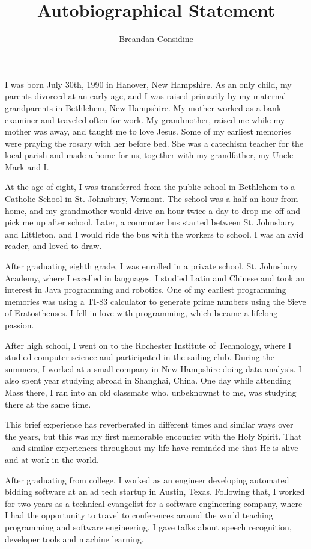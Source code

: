 \documentclass[11pt]{article}
\title{Autobiographical Statement}
\author{Breandan Considine}
\begin{document}
\maketitle
I was born July 30th, 1990 in Hanover, New Hampshire. As an only child, my parents divorced at an early age, and I was raised primarily by my maternal grandparents in Bethlehem, New Hampshire. My mother worked as a bank examiner and traveled often for work. My grandmother, raised me while my mother was away, and taught me to love Jesus. Some of my earliest memories were praying the rosary with her before bed. She was a catechism teacher for the local parish and made a home for us, together with my grandfather, my Uncle Mark and I.

At the age of eight, I was transferred from the public school in Bethlehem to a Catholic School in St. Johnsbury, Vermont. The school was a half an hour from home, and my grandmother would drive an hour twice a day to drop me off and pick me up after school. Later, a commuter bus started between St. Johnsbury and Littleton, and I would ride the bus with the workers to school. I was an avid reader, and loved to draw.

After graduating eighth grade, I was enrolled in a private school, St. Johnsbury Academy, where I excelled in languages. I studied Latin and Chinese and took an interest in Java programming and robotics. One of my earliest programming memories was using a TI-83 calculator to generate prime numbers using the Sieve of Eratosthenses. I fell in love with programming, which became a lifelong passion.

After high school, I went on to the Rochester Institute of Technology, where I studied computer science and participated in the sailing club. During the summers, I worked at a small company in New Hampshire doing data analysis. I also spent year studying abroad in Shanghai, China. One day while attending Mass there, I ran into an old classmate who, unbeknownst to me, was studying there at the same time.

This brief experience has reverberated in different times and similar ways over the years, but this was my first memorable encounter with the Holy Spirit. That -- and similar experiences throughout my life have reminded me that He is alive and at work in the world.

After graduating from college, I worked as an engineer developing automated bidding software at an ad tech startup in Austin, Texas. Following that, I worked for two years as a technical evangelist for a software engineering company, where I had the opportunity to travel to conferences around the world teaching programming and software engineering. I gave talks about speech recognition, developer tools and machine learning.
\end{document}
